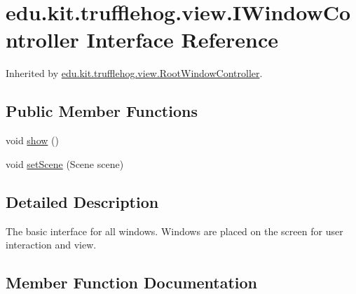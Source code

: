 \hypertarget{interfaceedu_1_1kit_1_1trufflehog_1_1view_1_1_i_window_controller}{}\section{edu.\+kit.\+trufflehog.\+view.\+I\+Window\+Controller Interface Reference}
\label{interfaceedu_1_1kit_1_1trufflehog_1_1view_1_1_i_window_controller}


Inherited by \hyperlink{classedu_1_1kit_1_1trufflehog_1_1view_1_1_root_window_controller}{edu.\+kit.\+trufflehog.\+view.\+Root\+Window\+Controller}.

\subsection*{Public Member Functions}
\begin{DoxyCompactItemize}
\item 
void \hyperlink{interfaceedu_1_1kit_1_1trufflehog_1_1view_1_1_i_window_controller_a8cf17f74f2b473371737bfaf0688dbad}{show} ()
\item 
void \hyperlink{interfaceedu_1_1kit_1_1trufflehog_1_1view_1_1_i_window_controller_af41448c2acecbda12476746074ac34e6}{set\+Scene} (Scene scene)
\end{DoxyCompactItemize}


\subsection{Detailed Description}
The basic interface for all windows. Windows are placed on the screen for user interaction and view. 

\subsection{Member Function Documentation}
\hypertarget{interfaceedu_1_1kit_1_1trufflehog_1_1view_1_1_i_window_controller_af41448c2acecbda12476746074ac34e6}{}
